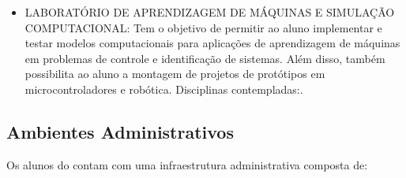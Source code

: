 \begin{itemize}
	\item [LAMSC] LABORATÓRIO DE APRENDIZAGEM DE MÁQUINAS E SIMULAÇÃO COMPUTACIONAL: Tem o objetivo de permitir ao aluno implementar e testar modelos computacionais para aplicações de aprendizagem de máquinas em problemas de controle e identificação de sistemas. Além disso, também possibilita ao aluno a montagem de projetos de protótipos em microcontroladores e robótica.
	Disciplinas contempladas:\LAMSCdisc.
	
	
	
\end{itemize}

\subsection{Ambientes Administrativos}

Os alunos do \NOMECURSO contam com uma infraestrutura administrativa composta de: %

